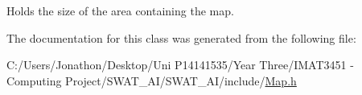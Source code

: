 Holds the size of the area containing the map. 



The documentation for this class was generated from the following file\+:\begin{DoxyCompactItemize}
\item 
C\+:/\+Users/\+Jonathon/\+Desktop/\+Uni P14141535/\+Year Three/\+I\+M\+A\+T3451 -\/ Computing Project/\+S\+W\+A\+T\+\_\+\+A\+I/\+S\+W\+A\+T\+\_\+\+A\+I/include/\hyperlink{_map_8h}{Map.\+h}\end{DoxyCompactItemize}
